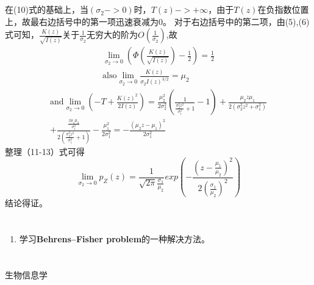 ﻿\documentclass[12pt]{article}
\begin{document}
\section{\textbf{}}
在(10)式的基础上，当$(\sigma_2->0)$时，$T(z)->+\infty$，由于$T(z)$在负指数位置上，故最右边括号中的第一项迅速衰减为0。
对于右边括号中的第二项，由(5),(6)式可知，$\frac{K(z)}{\sqrt{I(z)}}$关于$\frac{1}{\sigma_2}$无穷大的阶为$O(\frac{1}{\sigma_2})$,故
\begin{eqnarray}
\lim_{\sigma_2 \to 0}(\Phi(\frac{K(z)}{\sqrt{I(z)}})-\frac{1}{2})=\frac{1}{2}\\
\mbox{also} \lim_{\sigma_2 \to 0}\frac{K(z)}{\sigma_2 I(z)^{3/2}}=\mu_2 
\end{eqnarray}
\begin{multline}
\mbox{and} \lim_{\sigma_2 \to 0}(-T+\frac{K(z)^2}{2I(z)})=\frac{\mu_2^2}{2 \sigma_2^2}(\frac{1}{\frac{\sigma_2^2 z^2}{\sigma_1^2}+1}-1)
+\frac{\mu_2z\mu_1}{2(\sigma_2^2 z^2+\sigma_1^2)}\\
+\frac{\frac{z\mu_1\mu_2}{\sigma_1^2}}{2(\frac{\sigma_2^2 z^2}{\sigma_1^2}+1)}-\frac{\mu_1^2}{2\sigma_1^2}
=-\frac{(\mu_2z-\mu_1)^2}{2\sigma_1^2}
\end{multline}
整理（11-13）式可得
\begin{equation}
\lim_{\sigma_2 \to 0}p_Z(z)=\frac{1}{\sqrt{2\pi}\frac{\sigma_1}{\mu_2}}exp(-\frac{(z-\frac{\mu_1}{\mu_2})^2}{2(\frac{\sigma_1}{\mu_2})^2})
\end{equation}
结论得证。
\section{\textbf{}}
\begin{enumerate}
\item 学习\textbf{Behrens–Fisher problem}的一种解决方法。
\end{enumerate}
\section{\textbf{}}
\begin{thebibliography}{}
 生物信息学
\end{thebibliography}
\end{document}
